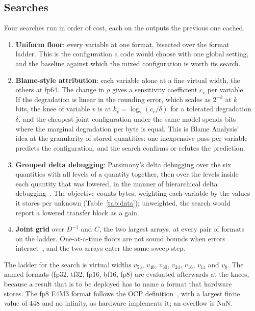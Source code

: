 \documentclass[11pt]{article}
\begin{document}
\subsection{Searches}
\label{sec:searches}
Four searches run in order of cost, each on the outputs the previous one cached.
\begin{enumerate}
  \item \textbf{Uniform floor}: every variable at one format, bisected over the format ladder.
    This is the configuration a code would choose with one global setting, and the baseline
    against which the mixed configuration is worth its search.
  \item \textbf{Blame-style attribution}: each variable alone at a fine virtual width, the
    others at fp64.  The change in $\rho$ gives a sensitivity coefficient $c_v$ per variable.
    If the degradation is linear in the rounding error, which scales as $2^{-k}$ at $k$ bits,
    the knee of variable $v$ is at $k_v = \log_2 (c_v / \delta)$ for a tolerated degradation
    $\delta$, and the cheapest joint configuration under the same model spends bits where the
    marginal degradation per byte is equal.  This is Blame Analysis' idea at the granularity of
    stored quantities: one inexpensive pass per variable predicts the configuration, and the
    search confirms or refutes the prediction.
  \item \textbf{Grouped delta debugging}: Parsimony's delta debugging over the six quantities
    with all levels of a quantity together, then over the levels inside each quantity that was
    lowered, in the manner of hierarchical delta debugging~\cite{hdd}.  The objective counts
    bytes, weighting each variable by the values it stores per unknown
    (Table~\ref{tab:data}); unweighted, the search would report a lowered transfer block as a
    gain.
  \item \textbf{Joint grid} over $D^{-1}$ and $C$, the two largest arrays, at every pair of
    formats on the ladder.  One-at-a-time floors are not sound bounds when errors
    interact~\cite{parsimony}, and the two arrays enter the same sweep step.
\end{enumerate}
The ladder for the search is virtual widths $v_{53}$, $v_{40}$, $v_{30}$, $v_{24}$, $v_{16}$,
$v_{11}$ and $v_8$.  The named formats (fp32, tf32, fp16, bf16, fp8) are evaluated afterwards
at the knees, because a result that is to be deployed has to name a format that hardware
stores.  The fp8 E4M3 format follows the OCP definition~\cite{ocpfp8}, with a largest
finite value of 448 and no infinity, as hardware implements it; an overflow is NaN.
\end{document}
